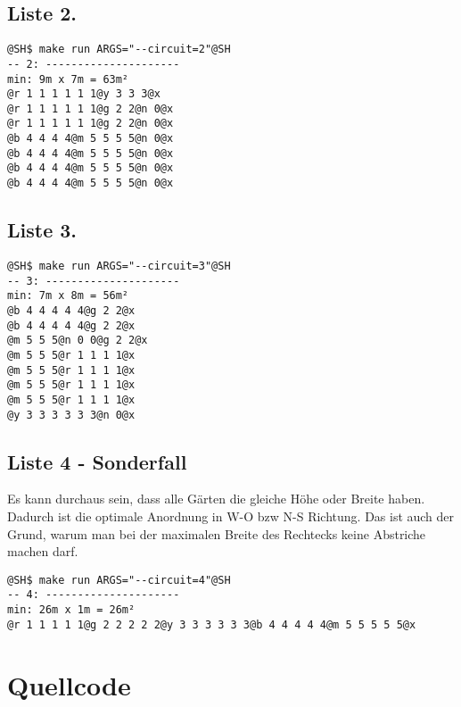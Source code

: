 \documentclass[a4paper,10pt,ngerman]{scrartcl}
\begin{document}
\subsection{Liste 2.}
\begin{lstlisting}
@SH$ make run ARGS="--circuit=2"@SH
-- 2: ---------------------
min: 9m x 7m = 63m²
@r 1 1 1 1 1 1@y 3 3 3@x
@r 1 1 1 1 1 1@g 2 2@n 0@x
@r 1 1 1 1 1 1@g 2 2@n 0@x
@b 4 4 4 4@m 5 5 5 5@n 0@x
@b 4 4 4 4@m 5 5 5 5@n 0@x
@b 4 4 4 4@m 5 5 5 5@n 0@x
@b 4 4 4 4@m 5 5 5 5@n 0@x
\end{lstlisting}

\subsection{Liste 3.}
\begin{lstlisting}
@SH$ make run ARGS="--circuit=3"@SH
-- 3: ---------------------
min: 7m x 8m = 56m²
@b 4 4 4 4 4@g 2 2@x
@b 4 4 4 4 4@g 2 2@x
@m 5 5 5@n 0 0@g 2 2@x
@m 5 5 5@r 1 1 1 1@x
@m 5 5 5@r 1 1 1 1@x
@m 5 5 5@r 1 1 1 1@x
@m 5 5 5@r 1 1 1 1@x
@y 3 3 3 3 3 3@n 0@x
\end{lstlisting}

\subsection{Liste 4 - Sonderfall}
Es kann durchaus sein, dass alle Gärten die gleiche Höhe oder Breite haben. Dadurch ist die optimale Anordnung in W-O bzw N-S Richtung. Das ist auch der Grund, warum man bei der maximalen Breite des Rechtecks keine Abstriche machen darf.
\begin{lstlisting}
@SH$ make run ARGS="--circuit=4"@SH
-- 4: ---------------------
min: 26m x 1m = 26m²
@r 1 1 1 1 1@g 2 2 2 2 2@y 3 3 3 3 3 3@b 4 4 4 4 4@m 5 5 5 5 5@x
\end{lstlisting}


\pagebreak
\section{Quellcode}
\end{document}
